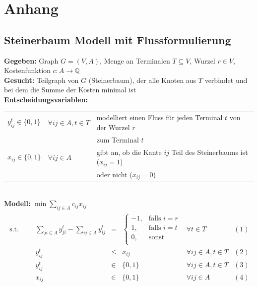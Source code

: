 \documentclass[11pt,a4paper]{article}
\newcommand{\Q}{\mathbb{Q}}
\theoremstyle{my_th_style1}
\begin{document}
\newpage
\section*{Anhang}
\subsection*{Steinerbaum Modell mit Flussformulierung}
\textbf{Gegeben:} Graph $G=(V,A)$, Menge an Terminalen $T \subseteq V $, Wurzel $r \in V$, Kostenfunktion $c:A \rightarrow \Q$\\
\textbf{Gesucht:} Teilgraph von $G$ (Steinerbaum), der alle Knoten aus $T$ verbindet und bei dem die Summe der Kosten minimal ist\\
\textbf{Entscheidungsvariablen:}\\
\begin{tabular}{lll}
	$y_{ij}^t \in \{0,1\}$ &$\forall ij \in A, t\in T $ & modelliert einen Fluss für jeden Terminal $t$ von der Wurzel $r$\\
	&& zum Terminal $t$\\
	$x_{ij} \in \{0,1\}$ & $\forall ij \in A$ &gibt an, ob die Kante $ij$ Teil des Steinerbaums ist ($x_{ij}=1$)\\
	&& oder nicht ($x_{ij}=0$)\\
\end{tabular}\\
\textbf{Modell:}
$\min \displaystyle\sum_{ij \in A} c_{ij} x_{ij} $
\begin{align}
\begin{array}{rcrcrcll}
\textrm{s.t.}  
&& &\displaystyle\sum_{ji \in A} y_{ji}^t - \displaystyle\sum_{ij \in A} y_{ij}^t& = & \left\{\begin{array}{rl} 
-1, & \text{falls } i=r\\ 
1, & \text{falls } i=t\\ 
0, & \text{sonst}\\ 
\end{array}
\right. & \forall t \in T & (1) \\
  &&& y_{ij}^t & \leq & x_{ij} & \forall ij \in A, t\in T & (2)\\
&&& y_{ij}^t & \in & \{0,1 \}& \forall ij \in A , t \in T& (3)\\
&&& x_{ij} & \in & \{0,1\}& \forall ij \in A & (4)\\
\end{array}
\label{SteinerbaumModel}
\end{align}
\end{document}
